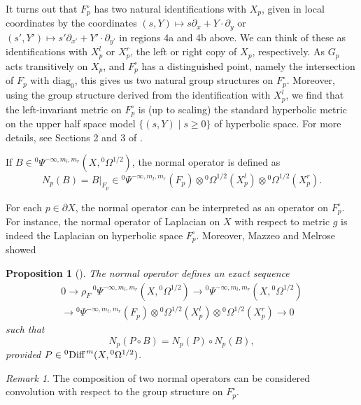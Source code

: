 \documentclass[10pt, a4paper, twoside]{amsart}
\numberwithin{equation}{section}
\newtheorem{proposition}[theorem]{Proposition}
\theoremstyle{remark}
\newtheorem{remark}[theorem]{Remark}
\begin{document}
It turns out that $F_p^\circ$ has two natural identifications with $X_p$, given in local coordinates by the coordinates $(s, Y) \mapsto s \partial_x + Y \cdot \partial_y$ or $(s', Y') \mapsto s' \partial_{x'} + Y' \cdot \partial_{y'}$ in regions 4a and 4b above. 
We can think of these as identifications with $X_p^l$ or $X_p^r$, the left or right copy of $X_p$, respectively. 
As $G_p$ acts transitively on $X_p$, and $F_p^\circ$ has a distinguished point, namely the intersection of $F_p$ with ${\mathrm{diag}_0}$, this gives us two natural group structures on $F_p^\circ$. 
Moreover, using the group structure derived from the identification with $X_p^l$, we find that the left-invariant metric on $F_p^\circ$ is (up to scaling) the standard hyperbolic metric on the upper half space model $\{ (s, Y) \mid s \geq 0 \}$ of hyperbolic space. 
For more details, see Sections 2 and 3 of \cite{Mazzeo-Melrose}. 

If $B \in {}^0\Psi^{- \infty, m_l, m_r}(X, {}^0\Omega^{1/2})$, the normal operator is defined as $$N_p(B) = B|_{{F}_p} \in {}^0\Psi^{- \infty, m_l, m_r}({F}_p) \otimes {}^0\Omega^{1/2}(X^l_p) \otimes {}^0\Omega^{1/2}(X^r_p).$$

For each $p \in \partial X$, the normal operator can be interpreted as an operator on $F_p^\circ$. For instance, the normal operator of Laplacian on $X$ with respect to metric $g$ is indeed the Laplacian on hyperbolic space $F_p^\circ$.  Moreover, Mazzeo and Melrose showed \begin{proposition}[\cite{Mazzeo-Melrose}] The normal operator defines an exact sequence \begin{eqnarray*}0 \longrightarrow \rho_F \, {}^0\Psi^{- \infty, m_l, m_r}(X, {}^0\Omega^{1/2}) \longrightarrow  {}^0\Psi^{- \infty, m_l, m_r}(X, {}^0\Omega^{1/2}) \\\longrightarrow  {}^0\Psi^{- \infty, m_l, m_r}(F_p) \otimes {}^0\Omega^{1/2}(X^l_p) \otimes {}^0\Omega^{1/2}(X^r_p) \longrightarrow 0\end{eqnarray*} such that 
\begin{equation}
N_p(P \circ B) = N_p(P) \circ N_p(B),
\label{normalop-comp}\end{equation}
 provided $P \in {}^0\text{Diff\,}^m (X, {}^0 \Omega^{1/2})$. 
 \end{proposition}

\begin{remark} The composition of two normal operators can be considered convolution with respect to the group structure on $F_p^\circ$. 
\end{remark}
\end{document}
